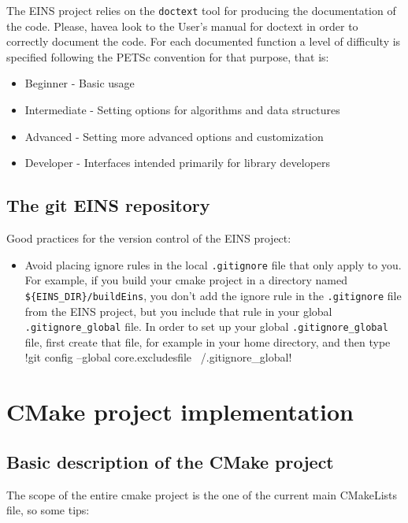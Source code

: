 \documentclass[a4paper,11pt]{report}
\begin{document}
The EINS project relies on the \verb!doctext! tool for producing the
documentation of the code. Please, havea look to the User's manual for
doctext \cite{doctext} in order to correctly document the code. For
each documented function a level of difficulty is specified following
the PETSc convention for that purpose, that is:  
\begin{itemize}[noitemsep,topsep=2pt,parsep=2pt,partopsep=2pt]
\item Beginner - Basic usage
\item Intermediate - Setting options for algorithms and data structures
\item Advanced - Setting more advanced options and customization
\item Developer - Interfaces intended primarily for library developers
\end{itemize}

\section{The git EINS repository}

Good practices for the version control of the EINS project:
\begin{itemize}
\item Avoid placing ignore rules in the local \verb!.gitignore! file
  that only apply to you. For example, if you build your cmake
  project in a directory named \verb!${EINS_DIR}/buildEins!, you don't
  add the ignore rule in the \verb!.gitignore! file from the EINS
  project, but you include that rule in your global \verb!.gitignore_global!
  file. In order to set up your global \verb!.gitignore_global! file, first
  create that file, for example in your home directory, and then type
  !git config --global core.excludesfile ~/.gitignore_global!
\end{itemize}



\chapter{CMake project implementation}

\section{Basic description of the CMake project}

The scope of the entire cmake project is the one of the current main
CMakeLists file, so some tips:
\end{document}
